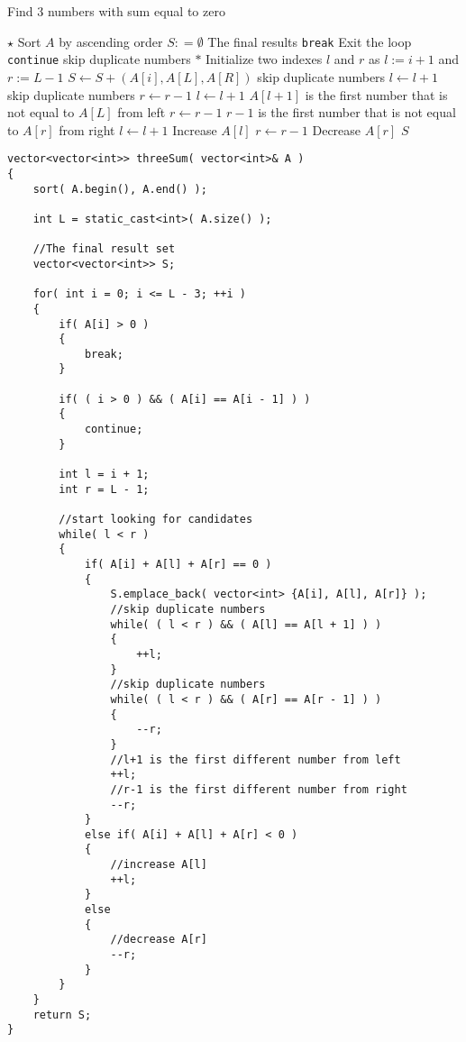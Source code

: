 \setcounter{algorithm}{0}
\begin{algorithm}[H]
\caption{Find 3 numbers with sum equal to zero}
\begin{algorithmic}[1]
\State $\star$ Sort $A$ by ascending order
\State $S: = \emptyset$ \Comment The final results
\State \texttt{break} \Comment Exit the loop
\EndIf
{} \State \texttt{continue} \Comment skip duplicate numbers
\EndIf
\State $\ast$ Initialize two indexes $l$ and $r$ as $l:=i+1$ and $r:=L-1$
\State $S \gets S + (A[i], A[L], A[R]) $
 \Comment skip duplicate numbers
\State $l \gets l+1$
\EndWhile
{} \Comment skip duplicate numbers
\State $r \gets r-1$
\EndWhile
\State $l \gets l+1$ \Comment $A[l+1]$ is the first number that is not equal to $A[L]$ from left
\State $r \gets r-1$ \Comment $r-1$ is the first number that is not equal to $A[r]$ from right
\State $l \gets l+1$ \Comment Increase $A[l]$
\Else
\State $r \gets r-1$ \Comment Decrease $A[r]$
\EndIf
\EndWhile
\EndFor
\State \Return $S$
\EndProcedure
\end{algorithmic}
\end{algorithm}
\setcounter{lstlisting}{0}
\begin{lstlisting}[style=customc, caption={Sorting}]
vector<vector<int>> threeSum( vector<int>& A )
{
    sort( A.begin(), A.end() );

    int L = static_cast<int>( A.size() );

    //The final result set
    vector<vector<int>> S;

    for( int i = 0; i <= L - 3; ++i )
    {
        if( A[i] > 0 )
        {
            break;
        }

        if( ( i > 0 ) && ( A[i] == A[i - 1] ) )
        {
            continue;
        }

        int l = i + 1;
        int r = L - 1;

        //start looking for candidates
        while( l < r )
        {
            if( A[i] + A[l] + A[r] == 0 )
            {
                S.emplace_back( vector<int> {A[i], A[l], A[r]} );
                //skip duplicate numbers
                while( ( l < r ) && ( A[l] == A[l + 1] ) )
                {
                    ++l;
                }
                //skip duplicate numbers
                while( ( l < r ) && ( A[r] == A[r - 1] ) )
                {
                    --r;
                }
                //l+1 is the first different number from left
                ++l;
                //r-1 is the first different number from right
                --r;
            }
            else if( A[i] + A[l] + A[r] < 0 )
            {
                //increase A[l]
                ++l;
            }
            else
            {
                //decrease A[r]
                --r;
            }
        }
    }
    return S;
}

\end{lstlisting}